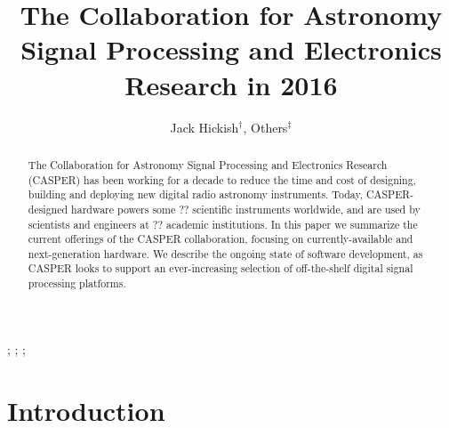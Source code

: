 \documentclass{ws-jai}
\begin{document}
\catchline{}{}{}{}{} %


\title{The Collaboration for Astronomy Signal Processing and Electronics Research in 2016}

\author{Jack Hickish$^\dagger$, Others$^\ddagger$}

\address{
$^\dagger$Radio Astronomy Laboratory, UC Berkeley, Berkeley, CA 94720, USA, jackh@astro.berkeley.edu\\
$^\ddagger$Group, Company, Address, City, State ZIP/Zone, Country\\
$^\S$Group, Company, Address, City, State ZIP/Zone, Country, fauthor@company.com
}

\maketitle


\begin{history}
;
;
;
\end{history}

\begin{abstract}

The Collaboration for Astronomy Signal Processing and Electronics Research
(CASPER) has been working for a decade to reduce the time and cost of designing,
building and deploying new digital radio astronomy instruments.  Today,
CASPER-designed hardware powers some ?? scientific instruments worldwide, and
are used by scientists and engineers at ?? academic institutions.  In this paper
we summarize the current offerings of the CASPER collaboration, focusing on
currently-available and next-generation hardware.  We describe the ongoing state
of software development, as CASPER looks to support an ever-increasing selection
of off-the-shelf digital signal processing platforms.

\end{abstract}


\section{Introduction}
\end{document}
